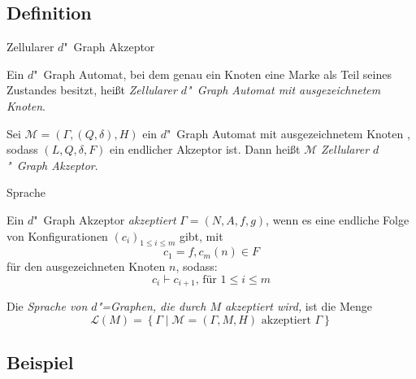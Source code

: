 \documentclass[18pt]{beamer}
\newcommand{\defWord}[1]{\emph{#1}}
\begin{document}
\subsection{Definition}
\begin{frame}{Zellularer $d$"~Graph Akzeptor}
	\begin{definition}
		Ein $d$"~Graph Automat, bei dem genau ein Knoten eine Marke als Teil seines Zustandes  besitzt, heißt \defWord{Zellularer $d$"~Graph Automat mit ausgezeichnetem Knoten}.
	\end{definition}
	\begin{definition}
		Sei $\mathcal{M} = \left(\Gamma, (Q, \delta), H \right)$ ein $d$"~Graph Automat mit ausgezeichnetem Knoten , sodass $(L, Q, \delta, F)$ ein endlicher Akzeptor ist.
		Dann heißt $\mathcal{M}$ \defWord{Zellularer $d$"~Graph Akzeptor}.
	\end{definition}
\end{frame}

\begin{frame}{Sprache}
	\begin{definition}[Akzeptanz]
		Ein $d$"~Graph Akzeptor \defWord{akzeptiert} $\Gamma = (N, A, f, g)$, wenn es eine endliche Folge von Konfigurationen $\left(c_i\right)_{1 \le i \le m}$ gibt, mit
		\begin{displaymath}
		c_1 = f, c_m(n) \in F
		\end{displaymath}
		für den ausgezeichneten Knoten $n$, sodass:
		\begin{displaymath}
		c_{i} \vdash c_{i+1} \text{, für } 1 \le i \le m
		\end{displaymath}
	\end{definition}
	\begin{definition}[Sprache]
		Die \defWord{Sprache von $d$"=Graphen, die durch $M$ akzeptiert wird,} ist die Menge 
		\begin{displaymath}
		\mathcal{L}(M) = \left\{\Gamma \mid \mathcal{M} = \left(\Gamma, M, H\right) \text{ akzeptiert } \Gamma \right\}
		\end{displaymath}
	\end{definition}
\end{frame}
\subsection{Beispiel}
\end{document}
